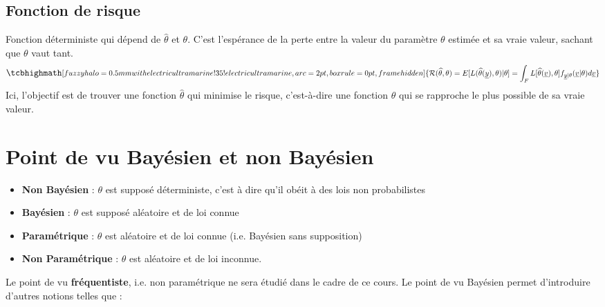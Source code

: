 \subsection{Fonction de risque}
\noindent Fonction déterministe qui dépend de $\widehat{\theta}$ et $\theta$. C'est l'espérance de la perte entre la valeur du paramètre $\theta$ estimée et sa vraie valeur, sachant que $\theta$ vaut tant.
\begin{equation}
    \large
    \tcbhighmath[fuzzy halo=0.5mm with electricultramarine!35!electricultramarine,arc=2pt,
    boxrule=0pt,frame hidden]{ 
        \mathcal{R}(\widehat{\theta},\theta) = E[L(\widehat{\theta}(\underline{y}),\theta)|\theta] = \int_{F}{L[\widehat{\theta}(\underline{v}), \theta]f_{\underline{y}|\theta}(\underline{v}|\theta)}{d\underline{v}} \nonumber
     } \nonumber
    \normalsize
\end{equation}
Ici, l'objectif est de trouver une fonction $\widehat{\theta}$ qui minimise le risque, c'est-à-dire une fonction $\widehat{\theta}$ qui se rapproche le plus possible de sa vraie valeur.
\section{Point de vu Bayésien et non Bayésien}
\begin{itemize}
    \item \textbf{Non Bayésien} : $\theta$ est supposé déterministe, c'est à dire qu'il obéit à des lois non probabilistes \newline
    \item \textbf{Bayésien} : $\theta$ est supposé aléatoire et de loi connue \newpage
    \item \textbf{Paramétrique} : $\theta$ est aléatoire et de loi connue (i.e. Bayésien sans supposition) \newline
    \item \textbf{Non Paramétrique} : $\theta$ est aléatoire et de loi inconnue. \newline
\end{itemize}
\noindent Le point de vu \textbf{fréquentiste}, i.e. non paramétrique ne sera étudié dans le cadre de ce cours. Le point de vu Bayésien permet d'introduire d'autres notions telles que : \newline
